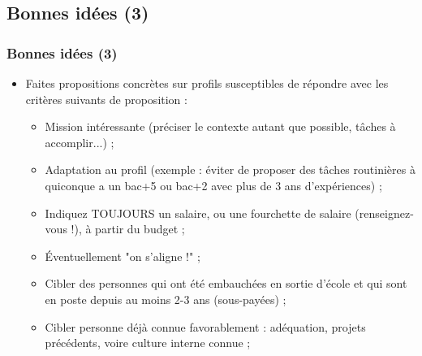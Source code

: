 \documentclass[slidetop,11pt]{beamer}
\begin{document}
\subsection{Bonnes id{\'e}es (3)}
\begin{frame}
	\frametitle{Bonnes id{\'e}es (3)}
	\begin{itemize}
		\item Faites propositions concr{\`e}tes sur profils susceptibles de r{\'e}pondre avec les crit{\`e}res suivants de proposition :
		\begin{itemize}
			\item Mission int{\'e}ressante (pr{\'e}ciser le contexte autant que possible, t{\^a}ches {\`a} accomplir...) ; 
			\item Adaptation au profil (exemple : {\'e}viter de proposer des t{\^a}ches routini{\`e}res {\`a} quiconque a un bac+5 ou bac+2 avec plus de 3 ans d'exp{\'e}riences) ; 
			\item Indiquez TOUJOURS un salaire, ou une fourchette de salaire (renseignez-vous !), {\`a} partir du budget ; 
			\item {\'E}ventuellement "on s'aligne !" ; 
			\item Cibler des personnes qui ont {\'e}t{\'e} embauch{\'e}es en sortie d'{\'e}cole 
				et qui sont en poste depuis au moins 2-3 ans (sous-pay{\'e}es) ;
			\item Cibler personne d{\'e}j{\`a} connue favorablement : ad{\'e}quation, projets pr{\'e}c{\'e}dents, voire culture interne connue ; 
		\end{itemize} 
	\end{itemize} 
\end{frame}
\end{document}
